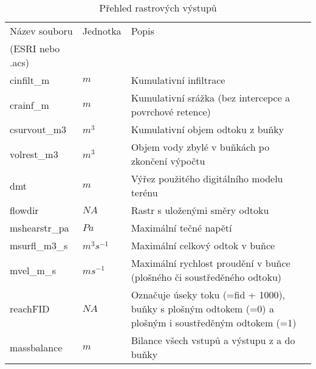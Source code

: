 

\begin{table}[t]
 

 \centering
 \caption{Přehled rastrových výstupů}
\label{tab:vystupyrast}

 \begin{tabular}{llp{}}
 \hline \hline
  Název souboru    & Jednotka    & Popis       \\ 
  (ESRI nebo .acs)    &     &        \\ \hline 
  cinfilt\_m      &   $m$        & Kumulativní infiltrace \\
  crainf\_m          &  $m$    &  Kumulativní srážka (bez intercepce a povrchové retence) \\
  csurvout\_m3       &  $m^3$  & Kumulativní objem odtoku z buňky \\
  volrest\_m3          &  $m^3$  & Objem vody zbylé v buňkách po zkončení výpočtu\\
  dmt                 &  $m$ &  Výřez použitého digitálního modelu terénu \\
  flowdir             &  $NA$ &  Rastr s uloženými směry odtoku  \\
  mshearstr\_pa      & $Pa$ &  Maximální tečné napětí \\
  msurfl\_m3\_s   &   $m^3s^{-1}$ &  Maximální celkový odtok v buňce\\
  mvel\_m\_s       &   $ms^{-1}$ &  Maximální rychlost proudění v buňce (plošného či soustředěného odtoku) \\
  reachFID            &  $NA$  &  Označuje úseky toku (=fid + 1000), buňky s plošným odtokem (=0) a plošným i soustředěným odtokem (=1) \\
  massbalance         &   $m$  &  Bilance všech vstupů a výstupu z a do buňky  \\
  \hline \hline

\end{tabular}
\end{table}
